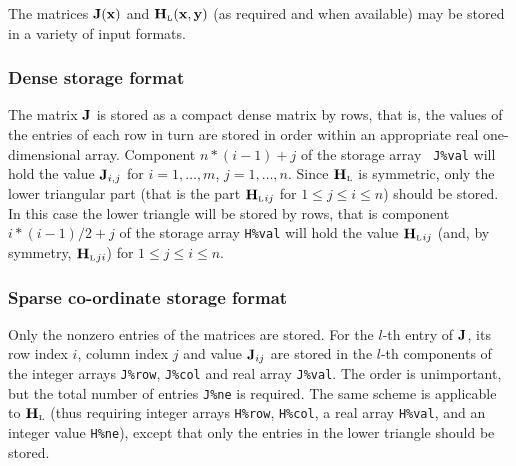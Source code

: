 \documentclass{galahad}
\newcommand{\bmHL}{\bmH\sub{L}}
\begin{document}

\galmatrix The matrices ${\mathbf{J}}({\mathbf{x}})$ and $\bmHL(\bmx,\bmy)$
(as required and when available) may be stored in a variety of input formats.

\subsubsection{Dense storage format}\label{dense}
The matrix ${\mathbf{J}}$ is stored as a compact
dense matrix by rows, that is, the values of the entries of each row in turn are
stored in order within an appropriate real one-dimensional array.
Component $n \ast (i-1) + j$ of the storage array {\tt
  J\%val} will hold the value ${\mathbf{J}}_{i,j}$ for $i = 1, \ldots , m$, $j =
1, \ldots , n$.  Since $\bmHL$ is symmetric, only the lower triangular
part (that is the part $\bmHL{}_{ij}$ for $1 \leq j \leq i \leq n$)
should be stored. In this case the lower triangle will be stored by rows,
that is component $i \ast (i-1)/2 + j$ of the storage array {\tt H\%val} will
hold the value $\bmHL{}_{ij}$ (and, by symmetry, $\bmHL{}_{ji}$) for 
$1 \leq j \leq i \leq n$. 

\subsubsection{Sparse co-ordinate storage format}\label{coordinate}
Only the nonzero entries of the matrices are stored. For the $l$-th
entry of ${\mathbf{J}}$, its row index $i$, column index $j$ and value
${\mathbf{J}}_{ij}$ are stored in the $l$-th components of the integer arrays
{\tt J\%row}, {\tt J\%col} and real array {\tt J\%val}.
The order is unimportant, but the total number of entries {\tt J\%ne} is
required.  The same scheme is applicable to $\bmHL$
(thus requiring integer arrays {\tt H\%row}, {\tt H\%col}, a real
array {\tt H\%val}, and an integer value {\tt H\%ne}), except that only
the entries in the lower triangle should be stored.

\end{document}
